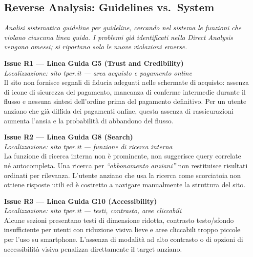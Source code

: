 \documentclass[11pt,a4paper]{article}
\begin{document}
\subsection*{Reverse Analysis: Guidelines vs.\ System}

\noindent\textit{Analisi sistematica guideline per guideline, cercando nel sistema le funzioni che violano ciascuna linea guida. I problemi già identificati nella Direct Analysis vengono omessi; si riportano solo le nuove violazioni emerse.}

\bigskip

\noindent\textbf{Issue R1 — Linea Guida G5 (Trust and Credibility)}\label{iss:R1}\\
\textit{Localizzazione: sito tper.it — area acquisto e pagamento online}\\

\noindent Il sito non fornisce segnali di fiducia adeguati nelle schermate di acquisto: assenza di icone di sicurezza del pagamento, mancanza di conferme intermedie durante il flusso e nessuna sintesi dell'ordine prima del pagamento definitivo. Per un utente anziano che già diffida dei pagamenti online, questa assenza di rassicurazioni aumenta l'ansia e la probabilità di abbandono del flusso.

\bigskip

\noindent\textbf{Issue R2 — Linea Guida G8 (Search)}\label{iss:R2}\\
\textit{Localizzazione: sito tper.it — funzione di ricerca interna}\\

\noindent La funzione di ricerca interna non è prominente, non suggerisce query correlate né autocompleta. Una ricerca per \textit{``abbonamento anziani''} non restituisce risultati ordinati per rilevanza. L'utente anziano che usa la ricerca come scorciatoia non ottiene risposte utili ed è costretto a navigare manualmente la struttura del sito.

\bigskip

\noindent\textbf{Issue R3 — Linea Guida G10 (Accessibility)}\label{iss:R3}\\
\textit{Localizzazione: sito tper.it — testi, contrasto, aree cliccabili}\\

\noindent Alcune sezioni presentano testi di dimensione ridotta, contrasto testo/sfondo insufficiente per utenti con riduzione visiva lieve e aree cliccabili troppo piccole per l'uso su smartphone. L'assenza di modalità ad alto contrasto o di opzioni di accessibilità visiva penalizza direttamente il target anziano.
\end{document}
